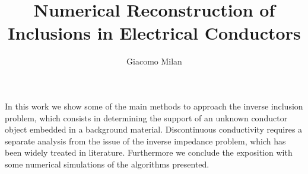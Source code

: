 \documentclass[10pt, a4paper, twoside, openright]{book}
\title{Numerical Reconstruction of Inclusions in Electrical Conductors}
\author{Giacomo Milan}
\theoremstyle{definition}
\theoremstyle{plain}
\theoremstyle{plain}
\theoremstyle{plain}
\theoremstyle{plain}
\theoremstyle{plain}
\theoremstyle{plain}
\theoremstyle{plain}
\theoremstyle{plain}
\newcommand{\fncyblank}{\fancyhf{}}
\newenvironment{abstract} %
{\cleardoublepage\fncyblank\null\vfill\begin{center} %
\bfseries\abstractname\end{center}} %
{\vfill\null}
\begin{document}
\maketitle
\tableofcontents
\listoffigures

\begin{abstract}
 In this work we show some of the main methods 
 to approach the inverse inclusion problem, which consists in determining 
 the support of an unknown conductor object embedded in a background material. 
 Discontinuous conductivity requires a separate analysis from the issue 
 of the inverse impedance problem, which has been widely treated in literature. 
 Furthermore we conclude the exposition with some numerical simulations 
 of the algorithms presented.
\end{abstract}

\end{document}

